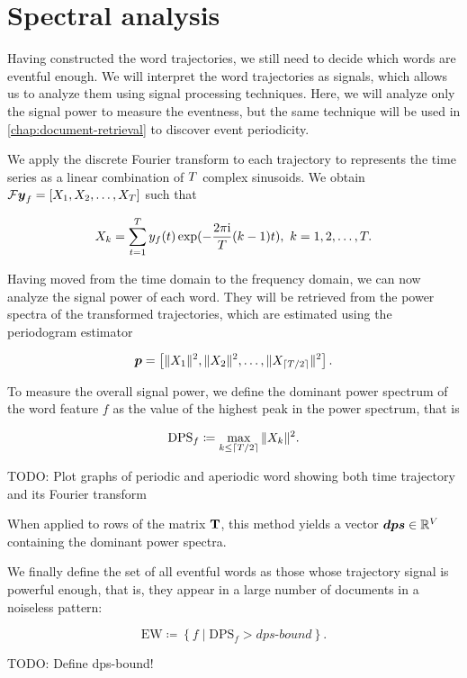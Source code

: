 \section{Spectral analysis}
Having constructed the word trajectories, we still need to decide which words are eventful enough. We will interpret the word trajectories as signals, which allows us to analyze them using signal processing techniques. Here, we will analyze only the signal power to measure the eventness, but the same technique will be used in \autoref{chap:document-retrieval} to discover event periodicity.

We apply the discrete Fourier transform to each trajectory to represents the time series as a linear combination of $T$ complex sinusoids. We obtain $\mathcal{F} \vect{\traj}_{f} = \left[ X_{1}, X_{2}, \dots, X_{\streamlen}\right ]$ such that

\begin{equation*}
	X_{k} = \sum_{t = 1}^{T}{y_{f}(t) \exp(- \frac{2 \pi \mathrm{i}}{T} (k - 1) t}), ~ k = 1, 2, \dots, T.
\end{equation*}

Having moved from the time domain to the frequency domain, we can now analyze the signal power of each word. They will be retrieved from the power spectra of the transformed trajectories, which are estimated using the periodogram estimator

\begin{equation*}
	\vect{P} = \left[ \|X_{1}\|^{2}, \|X_{2}\|^{2}, \dots, \|X_{\ceil{\streamlen / 2}}\|^{2} \right].
\end{equation*}

To measure the overall signal power, we define the dominant power spectrum of the word feature $f$ as the value of the highest peak in the power spectrum, that is

\begin{equation}
	\text{DPS}_{f} \coloneqq \max\limits_{k \leq \lceil T / 2\rceil}{\|X_{k}\|^{2}}.
\end{equation}

{\color{red} TODO: Plot graphs of periodic and aperiodic word showing both time trajectory and its Fourier transform}

When applied to rows of the matrix $\mathbf{T}$, this method yields a vector $\vect{DPS} \in \R^{\featcount}$ containing the dominant power spectra.

We finally define the set of all eventful words as those whose trajectory signal is powerful enough, that is, they appear in a large number of documents in a noiseless pattern:

\begin{equation}
	\text{EW} \coloneqq \left\{ f \mid \text{DPS}_{f} > \textit{dps-bound} \right\}.
\end{equation}

{\color{red}TODO: Define dps-bound!}